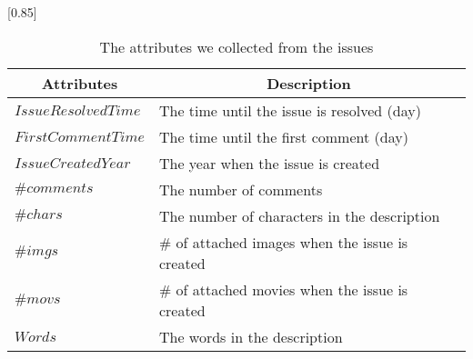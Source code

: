 
\begin{table}[t]
    \begin{center}
    \caption{The attributes we collected from the issues}
    \scalebox{0.85}[0.85]{
    \begin{tabular}{ll} 
        \toprule
        \multicolumn{1}{c}{\textbf{Attributes}} & \multicolumn{1}{c}{\textbf{Description}} \\ 
        \midrule
        $IssueResolvedTime$ & The time until the issue is resolved (day) \\
        $FirstCommentTime$ & The time until the first comment (day) \\
        $IssueCreatedYear$ & The year when the issue is created \\
        $\#comments$ & The number of comments \\
        $\#chars$ & The number of characters in the description \\
        $\#imgs$ & \# of attached images when the issue is created \\
        $\#movs$ & \# of attached movies when the issue is created \\
        $Words$ &  The words in the description \\
        \bottomrule
    \end{tabular}
    }
    \label{tab:issue-attr}
    \end{center}
\end{table}

